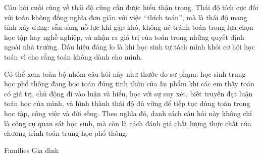 {{    Câu hỏi cuối cùng về thái độ cũng cần được hiểu thận trọng. Thái độ tích cực đối với toán không đồng nghĩa đơn giản với việc ``thích toán'', mà là thái độ mang tính xây dựng: sẵn sàng nỗ lực khi gặp khó, không né tránh toán trong lựa chọn học tập hay nghề nghiệp, và nhận ra giá trị của toán trong những quyết định ngoài nhà trường. Dấu hiệu đáng lo là khi học sinh tự tách mình khỏi cơ hội học toán vì cho rằng toán không dành cho mình.

    Có thể xem toàn bộ nhóm câu hỏi này như thước đo sư phạm: học sinh trung học phổ thông đang học toán đúng tinh thần của ấn phẩm khi các em thấy toán có giá trị, chủ động đi vào luận và hiểu, học với sự suy xét, biết truyền đạt luận toán học của mình, và hình thành thái độ đủ vững để tiếp tục dùng toán trong học tập, công việc và đời sống. Theo nghĩa đó, danh sách câu hỏi này không chỉ là công cụ quan sát học sinh, mà còn là cách đánh giá chất lượng thực chất của chương trình toán trung học phổ thông.}
  }

\ParallelSection
  {Families}
  {Gia đình}
  {}

